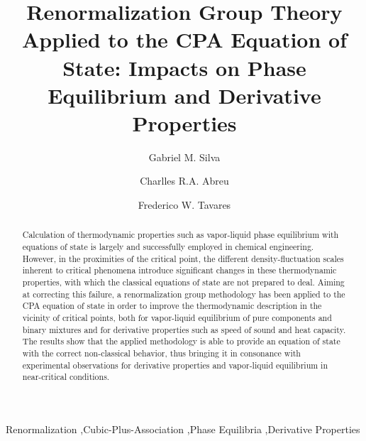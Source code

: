 \documentclass[preprint,12pt,3p]{elsarticle}
\date{\vspace{-5ex}}
\providecommand{\DIFaddbegin}{} %
\providecommand{\DIFaddend}{} %
\begin{document}
\begin{frontmatter}

\title{Renormalization Group Theory Applied to the CPA Equation of State: Impacts on Phase Equilibrium and Derivative Properties}


\author[1]{Gabriel M. Silva}
\author[1]{Charlles R.A. Abreu}
\author[1,2]{Frederico W. Tavares}
\address[1]{Escola de Química, Universidade Federal do Rio de Janeiro, Rio de Janeiro C.P. 68542, Brazil}
\address[2]{Programa de Engenharia Química – COPPE, Universidade Federal do Rio de Janeiro, Rio de Janeiro, C.P. 68542, Brazil}

\begin{abstract}
Calculation of thermodynamic properties such as vapor-liquid phase equilibrium with equations of state is largely and successfully employed in chemical engineering. However, in the proximities of the critical point, the different density-fluctuation scales inherent to critical phenomena introduce significant changes in these thermodynamic properties, with which the classical equations of state are not prepared to deal. Aiming at correcting this failure, a renormalization group methodology has been applied to the CPA equation of state in order to improve the thermodynamic description in the vicinity of critical points, both for vapor-liquid equilibrium of pure components and binary mixtures and for derivative properties such as speed of sound and heat capacity. The results show that the applied methodology is able to provide an equation of state with the correct non-classical behavior, thus bringing it in consonance with experimental observations for derivative properties and vapor-liquid equilibrium in near-critical conditions.\DIFaddbegin {}
\DIFaddend \end{abstract}

\begin{keyword}
Renormalization \sep Cubic-Plus-Association \sep Phase Equilibria \sep Derivative Properties
\end{keyword}

\end{frontmatter}

\linenumbers

\renewcommand{\thesection}{\arabic{section}}
\end{document}
